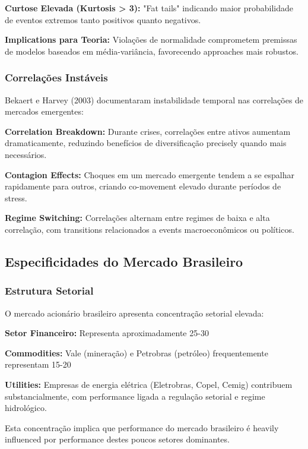 \textbf{Curtose Elevada (Kurtosis > 3):} "Fat tails" indicando maior probabilidade de eventos extremos tanto positivos quanto negativos.

\textbf{Implications para Teoria:} Violações de normalidade comprometem premissas de modelos baseados em média-variância, favorecendo approaches mais robustos.

\subsubsection{Correlações Instáveis}

Bekaert e Harvey (2003) documentaram instabilidade temporal nas correlações de mercados emergentes:

\textbf{Correlation Breakdown:} Durante crises, correlações entre ativos aumentam dramaticamente, reduzindo benefícios de diversificação precisely quando mais necessários.

\textbf{Contagion Effects:} Choques em um mercado emergente tendem a se espalhar rapidamente para outros, criando co-movement elevado durante períodos de stress.

\textbf{Regime Switching:} Correlações alternam entre regimes de baixa e alta correlação, com transitions relacionados a events macroeconômicos ou políticos.

\subsection{Especificidades do Mercado Brasileiro}

\subsubsection{Estrutura Setorial}

O mercado acionário brasileiro apresenta concentração setorial elevada:

\textbf{Setor Financeiro:} Representa aproximadamente 25-30%

\textbf{Commodities:} Vale (mineração) e Petrobras (petróleo) frequentemente representam 15-20%

\textbf{Utilities:} Empresas de energia elétrica (Eletrobras, Copel, Cemig) contribuem substancialmente, com performance ligada a regulação setorial e regime hidrológico.

Esta concentração implica que performance do mercado brasileiro é heavily influenced por performance destes poucos setores dominantes.

